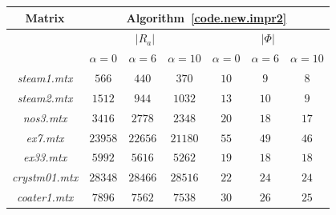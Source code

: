 \documentclass[12pt, twoside,a4paper,toc=bibliography]{scrbook}
\newcommand{\coderef}[1]{Algorithm~\protect\ref{#1}}
\begin{document}
\begin{table}
\centering
\begin{tabular}{|c|c|c|c|c|c|c|}
\hline
Matrix & \multicolumn{6}{c|}{\coderef{code.new.impr2}} \\\hline
{} & \multicolumn{3}{c|}{$|R_{a}|$} & \multicolumn{3}{c|}{$|\Phi|$}\\\hline
{}     & $\alpha=0$ & $\alpha=6$ & $\alpha=10$ & $\alpha=0$& $\alpha=6$&$\alpha=10$ \\\hline
\textit{steam1.mtx} & $566$ & $440$ & $370$ & $10$ & $9$ & $8$ \\\hline
\textit{steam2.mtx} & $1512$ & $944$ & $1032$ & $13$ & $10$ & $9$ \\\hline
\textit{nos3.mtx} & $3416$ & $2778$ & $2348$ & $20$ & $18$ & $17$ \\\hline
\textit{ex7.mtx} & $23958$ & $22656$ & $21180$ & $55$ & $49$ & $46$ \\\hline
\textit{ex33.mtx} & $5992$ & $5616$ & $5262$ & $19$ & $18$ & $18$ \\\hline
\textit{crystm01.mtx} & $28348$ & $28466$ & $28516$ & $22$ & $24$ & $24$ \\\hline
\textit{coater1.mtx} & $7896$ & $7562$ & $7538$ & $30$ & $26$ & $25$ \\\hline


\end{tabular}
\end{table}
\end{document}
